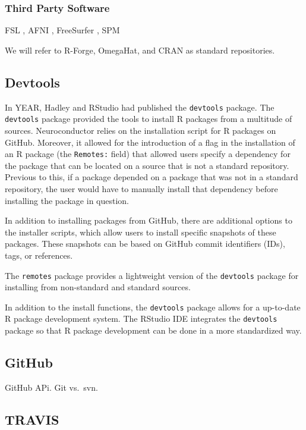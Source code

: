 \documentclass[]{elsarticle} %
\newcommand{\fixme}[1]{{\color{red} #1}}
\begin{document}
\subsubsection{Third Party Software}\label{third-party-software}

FSL \citep{fsl}, AFNI \citep{afni}, FreeSurfer \citep{freesurfer}, SPM \citep{spm}


We will refer to R-Forge, OmegaHat, and CRAN as standard
repositories.

\subsection{Devtools}\label{devtools}

In \fixme{YEAR}, Hadley and RStudio had published the \texttt{devtools} package.
The \texttt{devtools} package provided the tools to install R packages
from a multitude of sources. Neuroconductor relies on the
installation script for R packages on GitHub. Moreover, it allowed for
the introduction of a flag in the installation of an R package (the
\texttt{Remotes:} field) that allowed users specify a dependency for the
package that can be located on a source that is not a standard
repository. Previous to this, if a package depended on a package that
was not in a standard repository, the user would have to manually
install that dependency before installing the package in question.

In addition to installing packages from GitHub, there are additional
options to the installer scripts, which allow users to install specific
snapshots of these packages. These snapshots can be based on GitHub
commit identifiers (IDs), tags, or references.

The \texttt{remotes} package provides a lightweight version of the
\texttt{devtools} package for installing from non-standard and standard
sources.

In addition to the install functions, the \texttt{devtools} package
allows for a up-to-date R package development system. The RStudio IDE
integrates the \texttt{devtools} package so that R package development
can be done in a more standardized way.

\subsection{GitHub}\label{github}

GitHub APi. Git vs.~svn.

\subsection{TRAVIS}\label{travis}
\end{document}

